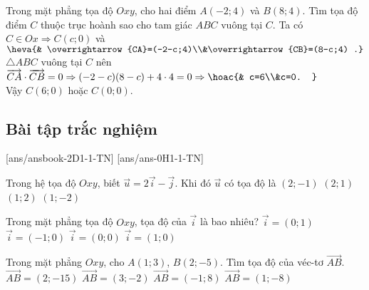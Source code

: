 \begin{bt}%
	Trong mặt phẳng tọa độ $Oxy$, cho hai điểm $A(-2;4)$ và $B(8;4)$. Tìm tọa độ điểm $C$ thuộc trục hoành sao cho tam giác $ABC$ vuông tại $C$.
	\loigiai
	{
		Ta có $C\in Ox\Rightarrow C(c;0)$ và $\heva{& \overrightarrow{CA}=(-2-c;4)\\&\overrightarrow{CB}=(8-c;4) .}$\\
		$\triangle ABC$ vuông tại $C$ nên $\overrightarrow{CA}\cdot\overrightarrow{CB}=0\Rightarrow (-2-c)(8-c)+4\cdot 4=0\Rightarrow\hoac{& c=6\\&c=0. }$\\
		Vậy $C(6;0)$ hoặc $C(0;0)$.
	}
\end{bt}

\subsection{Bài tập trắc nghiệm}
[ans/ansbook-2D1-1-TN]
[ans/ans-0H1-1-TN]
\begin{ex}%
	Trong hệ tọa độ $Oxy$, biết $\overrightarrow{u}=2\overrightarrow{i}-\overrightarrow{j}$. Khi đó $\overrightarrow{u}$ có tọa độ là
	\choice
	{\True $(2;-1)$}
	{$(2;1)$}
	{$(1;2)$}
	{$(1;-2)$}
\end{ex}
\begin{ex}%
	Trong mặt phẳng tọa độ $Oxy$, tọa độ của $\overrightarrow{i}$ là bao nhiêu?
	\choice
	{$\overrightarrow{i} = (0; 1)$}
	{$\overrightarrow{i} = (-1; 0)$}
	{$\overrightarrow{i} = (0; 0)$}
	{\True $\overrightarrow{i} = (1; 0)$}
\end{ex}
\begin{ex}%
	Trong mặt phẳng $Oxy$, cho $A(1;3)$, $B(2;-5)$. Tìm tọa độ của véc-tơ $\overrightarrow{AB}$.
	\choice
	{$\overrightarrow{AB}=(2;-15)$}
	{$\overrightarrow{AB}=(3;-2)$}
	{$\overrightarrow{AB}=(-1;8)$}
	{\True $\overrightarrow{AB}=(1;-8)$}
\end{ex}
